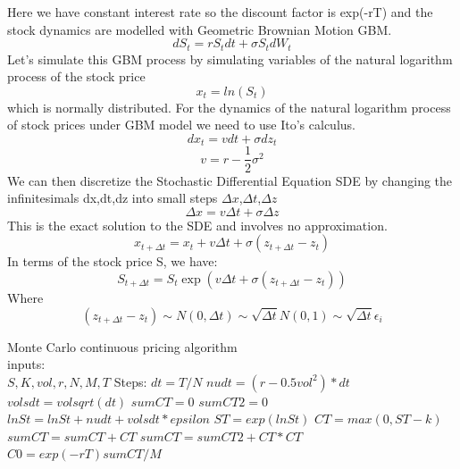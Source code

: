 \noindent Here we have constant interest rate so the discount factor is exp(-rT) and the stock dynamics are modelled with Geometric Brownian Motion GBM.
$$dS_{t}=rS_{t}dt+\sigma S_{t}dW_{t}$$
Let’s simulate this GBM process by simulating variables of the natural logarithm process of the stock price
$$x_{t}=ln(S_{t})$$ 
which is normally distributed. For the dynamics of the natural logarithm process of stock prices under GBM model we need to use Ito’s calculus.
$$dx_{t}=vdt+\sigma dz_{t}$$
$$v=r-\frac{1}{2}\sigma^2$$
We can then discretize the Stochastic Differential Equation SDE by changing the infinitesimals dx,dt,dz into small steps $\Delta x$,$\Delta t$,$\Delta z$
$$\Delta x=v\Delta t+\sigma\Delta z$$
This is the exact solution to the SDE and involves no approximation.
$$x_{t+\Delta t}=x_{t}+v\Delta t+\sigma(z_{t+\Delta t}-z_{t})$$
In terms of the stock price S, we have:
$$S_{t+\Delta t}=S_{t}\exp({v\Delta t+\sigma(z_{t+\Delta t}-z_{t})})$$
Where
$$(z_{t+\Delta t}-z_{t}) \sim N(0,\Delta t)\sim \sqrt{\Delta t}N(0,1) \sim \sqrt{\Delta t}\epsilon_{i}$$

\noindent Monte Carlo continuous pricing algorithm\\
inputs:  \\
$S, K, vol, r, N, M, T$ \newline
Steps:
$dt=T/N$ \newline
$nudt=(r-0.5vol^2)*dt$  \newline
$volsdt=volsqrt(dt)$  \newline
$sumCT=0$  \newline
$sumCT2=0$  \newline
\indent $lnSt=lnSt+nudt+volsdt*epsilon$  \newline
\indent $ST=exp(lnSt)$  \newline
\indent $CT=max(0,ST-k)$  \newline
\indent $sumCT=sumCT+CT$  \newline
\indent $sumCT=sumCT2+CT*CT$  \newline
$C0=exp(-rT)sumCT/M$  \newline


